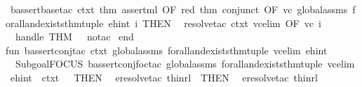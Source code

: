 \begin{isabellebody}
\ {\isacharparenleft}{\kern0pt}b{\isacharunderscore}{\kern0pt}assert{\isacharunderscore}{\kern0pt}base{\isacharunderscore}{\kern0pt}tac\ ctxt\ {\isacharparenleft}{\kern0pt}{\isacharat}{\kern0pt}{\isacharbraceleft}{\kern0pt}thm\ assert{\isacharunderscore}{\kern0pt}ml{\isacharbraceright}{\kern0pt}\ OF\ {\isacharbrackleft}{\kern0pt}red{\isacharbrackright}{\kern0pt}{\isacharparenright}{\kern0pt}\ {\isacharparenleft}{\kern0pt}{\isacharat}{\kern0pt}{\isacharbraceleft}{\kern0pt}thm\ conjunct{}{\isacharbraceright}{\kern0pt}\ OF\ {\isacharbrackleft}{\kern0pt}vc{\isacharbrackright}{\kern0pt}{\isacharparenright}{\kern0pt}\ global{\isacharunderscore}{\kern0pt}assms\ forall{\isacharunderscore}{\kern0pt}and{\isacharunderscore}{\kern0pt}exists{\isacharunderscore}{\kern0pt}thm{\isacharunderscore}{\kern0pt}tuple\ ehint\ i{\isacharparenright}{\kern0pt}\ THEN\isanewline
\ \ {\isacharparenleft}{\kern0pt}resolve{\isacharunderscore}{\kern0pt}tac\ ctxt\ {\isacharbrackleft}{\kern0pt}{\isacharparenleft}{\kern0pt}vc{\isacharunderscore}{\kern0pt}elim\ OF\ {\isacharbrackleft}{\kern0pt}vc{\isacharbrackright}{\kern0pt}{\isacharparenright}{\kern0pt}{\isacharbrackright}{\kern0pt}\ i{\isacharparenright}{\kern0pt}\ \ \isanewline
\ \ handle\ THM\ {\isacharunderscore}{\kern0pt}\ {\isacharequal}{\kern0pt}{\isachargreater}{\kern0pt}\ no{\isacharunderscore}{\kern0pt}tac\ \isanewline
end\isanewline
\isanewline
fun\ b{\isacharunderscore}{\kern0pt}assert{\isacharunderscore}{\kern0pt}conj{\isacharunderscore}{\kern0pt}tac\ ctxt\ global{\isacharunderscore}{\kern0pt}assms\ forall{\isacharunderscore}{\kern0pt}and{\isacharunderscore}{\kern0pt}exists{\isacharunderscore}{\kern0pt}thm{\isacharunderscore}{\kern0pt}tuple\ vc{\isacharunderscore}{\kern0pt}elim\ ehint\ {\isacharequal}{\kern0pt}\isanewline
\ \ {\isacharparenleft}{\kern0pt}Subgoal{\isachardot}{\kern0pt}FOCUS\ {\isacharparenleft}{\kern0pt}b{\isacharunderscore}{\kern0pt}assert{\isacharunderscore}{\kern0pt}conj{\isacharunderscore}{\kern0pt}foc{\isacharunderscore}{\kern0pt}tac\ global{\isacharunderscore}{\kern0pt}assms\ forall{\isacharunderscore}{\kern0pt}and{\isacharunderscore}{\kern0pt}exists{\isacharunderscore}{\kern0pt}thm{\isacharunderscore}{\kern0pt}tuple\ vc{\isacharunderscore}{\kern0pt}elim\ ehint\ {}{\isacharparenright}{\kern0pt}\ ctxt\ {}{\isacharparenright}{\kern0pt}\ \ THEN\isanewline
\ \ eresolve{}{\isacharunderscore}{\kern0pt}tac\ {\isacharbrackleft}{\kern0pt}thin{\isacharunderscore}{\kern0pt}rl{\isacharbrackright}{\kern0pt}\ {}\ THEN\isanewline
\ \ eresolve{}{\isacharunderscore}{\kern0pt}tac\ {\isacharbrackleft}{\kern0pt}thin{\isacharunderscore}{\kern0pt}rl{\isacharbrackright}{\kern0pt}\ {}\isanewline

\end{isabellebody}
